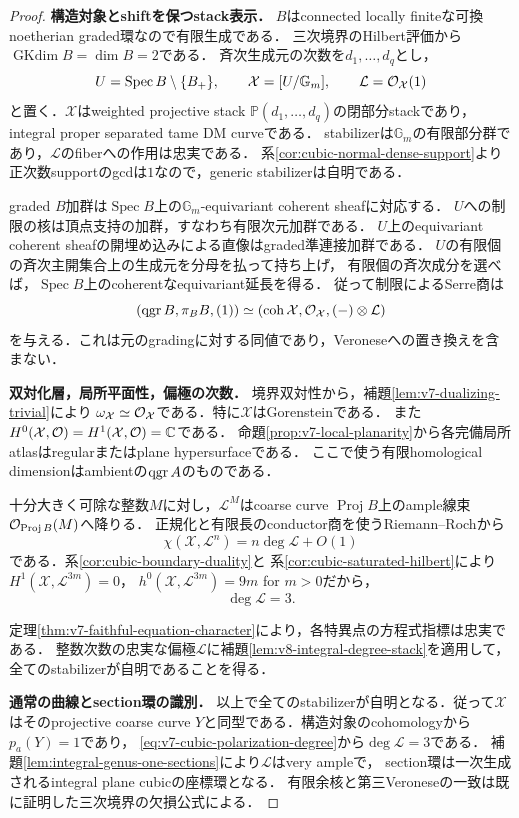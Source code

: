 \documentclass[11pt,a4paper]{ltjsarticle}
\begin{document}
\begin{proof}
\textbf{構造対象とshiftを保つstack表示．}
$B$はconnected locally finiteな可換noetherian graded環なので有限生成である．
三次境界のHilbert評価から$\operatorname{GKdim}B=\dim B=2$である．
斉次生成元の次数を$d_1,\ldots,d_q$とし，
\[
 U=\operatorname{Spec}B\setminus\{B_+\},\qquad
 \mathcal X=[U/\mathbb G_m],\qquad\mathcal L=\mathcal O_{\mathcal X}(1)
\]
と置く．$\mathcal X$はweighted projective stack
$\mathbb P(d_1,\ldots,d_q)$の閉部分stackであり，integral proper separated tame DM curveである．
stabilizerは$\mathbb G_m$の有限部分群であり，$\mathcal L$のfiberへの作用は忠実である．
系\ref{cor:cubic-normal-dense-support}より正次数supportのgcdは$1$なので，generic stabilizerは自明である．

graded $B$加群は$\operatorname{Spec}B$上の$\mathbb G_m$-equivariant coherent sheafに対応する．
$U$への制限の核は頂点支持の加群，すなわち有限次元加群である．
$U$上のequivariant coherent sheafの開埋め込みによる直像はgraded準連接加群である．
$U$の有限個の斉次主開集合上の生成元を分母を払って持ち上げ，
有限個の斉次成分を選べば，$\operatorname{Spec}B$上のcoherentなequivariant延長を得る．
従って制限によるSerre商は
\[
 (\operatorname{qgr} B,\pi_BB,(1))
 \simeq(\operatorname{coh}\mathcal X,\mathcal O_{\mathcal X},(-)\otimes\mathcal L)
\]
を与える．これは元のgradingに対する同値であり，Veroneseへの置き換えを含まない．

\textbf{双対化層，局所平面性，偏極の次数．}
境界双対性から，補題\ref{lem:v7-dualizing-trivial}により
$\omega_{\mathcal X}\simeq\mathcal O_{\mathcal X}$である．特に$\mathcal X$はGorensteinである．
また$H^0(\mathcal X,\mathcal O)=H^1(\mathcal X,\mathcal O)=\mathbb C$である．
命題\ref{prop:v7-local-planarity}から各完備局所atlasはregularまたはplane hypersurfaceである．
ここで使う有限homological dimensionはambientの$\operatorname{qgr} A$のものである．

十分大きく可除な整数$M$に対し，$\mathcal L^M$はcoarse curve
$\operatorname{Proj}B$上のample線束$\mathcal O_{\operatorname{Proj}B}(M)$へ降りる．
正規化と有限長のconductor商を使うRiemann--Rochから
\[
 \chi(\mathcal X,\mathcal L^n)=n\deg\mathcal L+O(1)
\]
である．系\ref{cor:cubic-boundary-duality}と
系\ref{cor:cubic-saturated-hilbert}により
$H^1(\mathcal X,\mathcal L^{3m})=0$，
$h^0(\mathcal X,\mathcal L^{3m})=9m$ for $m>0$だから，
\begin{equation}\label{eq:v7-cubic-polarization-degree}
 \deg\mathcal L=3.
\end{equation}

定理\ref{thm:v7-faithful-equation-character}により，各特異点の方程式指標は忠実である．
整数次数の忠実な偏極$\mathcal L$に補題\ref{lem:v8-integral-degree-stack}を適用して，
全てのstabilizerが自明であることを得る．

\textbf{通常の曲線とsection環の識別．}
以上で全てのstabilizerが自明となる．従って$\mathcal X$はそのprojective coarse curve
$Y$と同型である．構造対象のcohomologyから$p_a(Y)=1$であり，
\eqref{eq:v7-cubic-polarization-degree}から$\deg\mathcal L=3$である．
補題\ref{lem:integral-genus-one-sections}により$\mathcal L$はvery ampleで，
section環は一次生成されるintegral plane cubicの座標環となる．
有限余核と第三Veroneseの一致は既に証明した三次境界の欠損公式による．
\end{proof}
\end{document}

